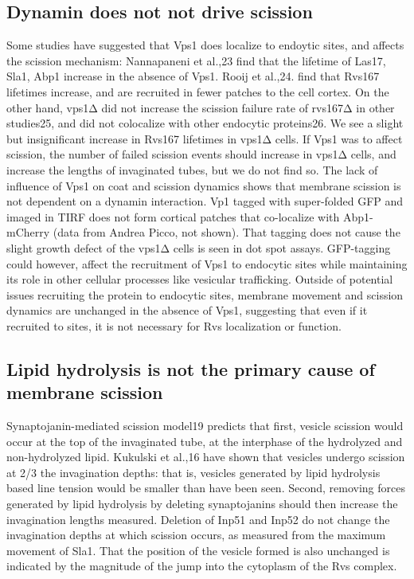 \subsection{Dynamin does not not drive scission}
Some studies have suggested that Vps1 does localize to endoytic sites, and affects the scission mechanism: Nannapaneni et al.,23 find that the lifetime of Las17, Sla1, Abp1 increase in the absence of Vps1. Rooij et al.,24. find that Rvs167 lifetimes increase, and are recruited in fewer patches to the cell cortex. On the other hand, vps1Δ did not increase the scission failure rate of rvs167Δ in other studies25, and did not colocalize with other endocytic proteins26. We see a slight but insignificant increase in Rvs167 lifetimes in vps1Δ cells. If Vps1 was to affect scission, the number of failed scission events should increase in vps1Δ cells, and increase the lengths of invaginated tubes, but we do not find so. The lack of influence of Vps1 on coat and scission dynamics shows that membrane scission is not dependent on a dynamin interaction. Vp1 tagged with super-folded GFP and imaged in TIRF does not form cortical patches that co-localize with Abp1-mCherry (data from Andrea Picco, not shown). That tagging does not cause the slight growth defect of the vps1Δ cells is seen in dot spot assays. GFP-tagging could however, affect the recruitment of Vps1 to endocytic sites while maintaining its role in other cellular processes like vesicular trafficking. Outside of potential issues recruiting the protein to endocytic sites, membrane movement and scission dynamics are unchanged in the absence of Vps1, suggesting that even if it recruited to sites, it is not necessary for Rvs localization or function. 


\subsection{Lipid hydrolysis is not the primary cause of membrane scission}
Synaptojanin-mediated scission model19 predicts that first, vesicle scission would occur at the top of the invaginated tube, at the interphase of the hydrolyzed and non-hydrolyzed lipid. Kukulski et al.,16 have shown that vesicles undergo scission at 2/3 the invagination depths: that is, vesicles generated by lipid hydrolysis based line tension would be smaller than have been seen. Second, removing forces generated by lipid hydrolysis by deleting synaptojanins should then increase the invagination lengths measured. Deletion of Inp51 and Inp52 do not change the invagination depths at which scission occurs, as measured from the maximum movement of Sla1. That the position of the vesicle formed is also unchanged is indicated by the magnitude of the jump into the cytoplasm of the Rvs complex. 

